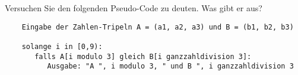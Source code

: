 Versuchen Sie den folgenden Pseudo-Code zu deuten. Was gibt er aus?
\begin{verbatim}
	Eingabe der Zahlen-Tripeln A = (a1, a2, a3) und B = (b1, b2, b3)
	
	solange i in [0,9):
	   falls A[i modulo 3] gleich B[i ganzzahldivision 3]:
	      Ausgabe: "A ", i modulo 3, " und B ", i ganzzahldivision 3 
\end{verbatim}
	